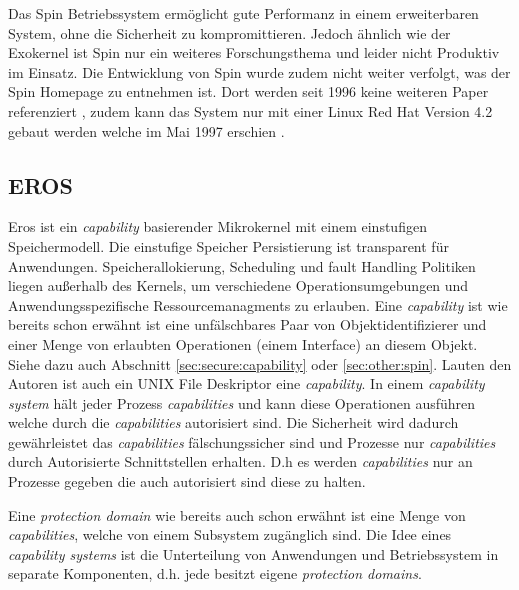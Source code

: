 \documentclass[11pt,technote]{IEEEtran}
\begin{document}
      Das Spin Betriebssystem erm\"oglicht gute Performanz in einem erweiterbaren System, ohne die Sicherheit zu kompromittieren.
      Jedoch \"ahnlich wie der Exokernel ist Spin nur ein weiteres Forschungsthema und leider nicht Produktiv im Einsatz.
      Die Entwicklung von Spin wurde zudem nicht weiter verfolgt, was der Spin Homepage zu entnehmen ist.
      Dort werden seit 1996 keine weiteren Paper referenziert \cite{Url:spin:papers}, zudem kann das System nur mit einer Linux Red Hat Version 4.2 
      gebaut werden welche im Mai 1997 erschien \cite{Url:spin:distro}.
      
    \subsection{EROS}      
      Eros ist ein \textit{capability} basierender Mikrokernel mit einem einstufigen Speichermodell. 
      Die einstufige Speicher Persistierung ist transparent f\"ur Anwendungen. Speicherallokierung, Scheduling und fault Handling Politiken 
      liegen au\ss erhalb des Kernels, um verschiedene Operationsumgebungen und Anwendungsspezifische Ressourcemanagments zu erlauben.
      Eine \textit{capability} ist wie bereits schon erw\"ahnt ist eine unf\"alschbares Paar von Objektidentifizierer und einer Menge von erlaubten Operationen
      (einem Interface) an diesem Objekt. Siehe dazu auch Abschnitt \ref{sec:secure:capability} oder \ref{sec:other:spin}.
      Lauten den Autoren ist auch ein UNIX File Deskriptor eine \textit{capability}. In einem \textit{capability system} 
      h\"alt jeder Prozess \textit{capabilities} und kann diese Operationen ausf\"uhren welche durch die \textit{capabilities} autorisiert sind. 
      Die Sicherheit wird dadurch gew\"ahrleistet das \textit{capabilities} f\"alschungssicher sind und Prozesse nur \textit{capabilities} durch
      Autorisierte Schnittstellen erhalten. D.h es werden \textit{capabilities} nur an Prozesse gegeben die auch autorisiert sind diese zu halten.
        
      Eine \textit{protection domain} wie bereits auch schon erw\"ahnt ist eine Menge von \textit{capabilities}, welche von einem Subsystem zug\"anglich sind.
      Die Idee eines \textit{capability systems} ist die Unterteilung von Anwendungen und Betriebssystem in separate Komponenten, d.h. jede besitzt eigene
      \textit{protection domains}.
        
\end{document}
